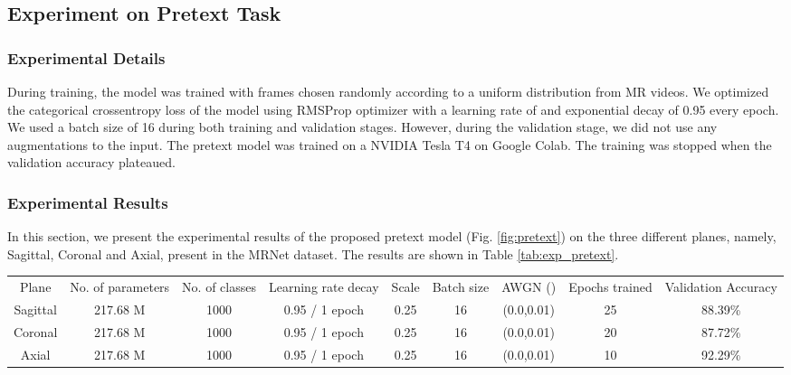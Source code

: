 \documentclass[journal]{IEEEtai}
\begin{document}
\subsection{Experiment on Pretext Task}
\label{subsubsec:exp_pre}

\subsubsection{Experimental Details}
\label{subsubsec:pre_exp_det}
\indent During training, the model was trained with frames chosen randomly according to a uniform distribution from MR videos. We optimized the categorical crossentropy loss of the model using RMSProp optimizer with a learning rate of  and exponential decay of 0.95 every epoch. We used a batch size of 16 during both training and validation stages. However, during the validation stage, we did not use any augmentations to the input. The pretext model was trained on a NVIDIA Tesla T4 on Google Colab. The training was stopped when the validation accuracy plateaued.

\subsubsection{Experimental Results}
\label{subsubsec:pre_exp_res}
\indent In this section, we present the experimental results of the proposed pretext model (Fig. \ref{fig:pretext}) on the three different planes, namely, Sagittal, Coronal and Axial, present in the MRNet dataset. The results are shown in Table \ref{tab:exp_pretext}. 

\begin{table*}[!ht]
    \centering
    \bgroup
    \caption{Experimental Results on the pretext task on different planes of Magnetic Resonance clips}
    \def\arraystretch{1.5}
    \begin{tabular}{c|c|c|c|c|c|c|c|c}
    \hline
       \multirow{2}{*}{Plane} & \multirow{2}{1.5cm}{\centering No. of parameters} & \multirow{2}{1cm}{\centering No. of classes} & \multirow{2}{2cm}{\centering Learning rate decay} & \multirow{2}{*}{Scale} & \multirow{2}{1cm}{\centering Batch size} & \multirow{2}{1.5cm}{\centering AWGN ()} & \multirow{2}{1.0cm}{\centering Epochs trained} & \multirow{2}{1.5cm}{\centering Validation Accuracy}\\
       {} &{} &{} &{} &{} &{} &{} &{} &{}   \\\hline \hline
Sagittal & 217.68 M & 1000 & 0.95 / 1 epoch & 0.25 & 16  & (0.0,0.01) & 25 & 88.39\%\\ \hline
Coronal & 217.68 M & 1000 & 0.95 / 1 epoch & 0.25 & 16  & (0.0,0.01) & 20 & 87.72\% \\\hline
Axial & 217.68 M & 1000 & 0.95 / 1 epoch & 0.25 & 16  & (0.0,0.01) & 10 & 92.29\%\\ \hline
    \end{tabular}
    \label{tab:exp_pretext}
    \egroup
\end{table*}
\end{document}
